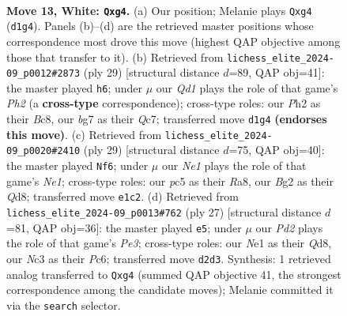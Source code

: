 \documentclass[11pt]{article}
\begin{document}
\clearpage

\begin{figure}[p]\centering
\begin{subfigure}{0.46\textwidth}\centering
\resizebox{\linewidth}{!}{%
\newchessgame
\chessboard[
  setfen={r1bqnr1k/pp1pppbp/8/2p5/2P3p1/2N5/PP1P1PBP/R1BQNRK1 w - - 0 13},
  showmover=false,
  pgfstyle=straightmove, color=movearrow, markmove={d1-g4}
]}
\caption{}
\end{subfigure}\hfill
\begin{subfigure}{0.46\textwidth}\centering
\resizebox{\linewidth}{!}{%
\newchessgame
\chessboard[
  setfen={r1b2rk1/ppq2ppp/3b1n2/8/3p4/3P1B1P/PP3PP1/RNBQR1K1 b - - 0 15},
  showmover=false,
  pgfstyle=straightmove, color=movearrow, markmove={h7-h6}
]}
\caption{}
\end{subfigure}
\\[4pt]
\begin{subfigure}{0.46\textwidth}\centering
\resizebox{\linewidth}{!}{%
\newchessgame
\chessboard[
  setfen={r1bqnrk1/pp2bppp/2p5/8/2NP4/8/PP3PPP/R1BQRBK1 b - - 0 15},
  showmover=false,
  pgfstyle=straightmove, color=movearrow, markmove={e8-f6}
]}
\caption{}
\end{subfigure}\hfill
\begin{subfigure}{0.46\textwidth}\centering
\resizebox{\linewidth}{!}{%
\newchessgame
\chessboard[
  setfen={r1bq1rk1/pp4pp/2p1pb2/3n4/8/1P6/1PPNBPPP/R1BQR1K1 b - - 1 14},
  showmover=false,
  pgfstyle=straightmove, color=movearrow, markmove={e6-e5}
]}
\caption{}
\end{subfigure}
\caption{\textbf{Move 13, White: \texttt{Qxg4}.} (a) Our position; Melanie plays \texttt{Qxg4} (\texttt{d1g4}). Panels (b)--(d) are the retrieved master positions whose correspondence most drove this move (highest QAP objective among those that transfer to it). (b) Retrieved from \texttt{lichess\_elite\_2024-09\_p0012\#2873} (ply 29) [structural distance $d$=89, QAP obj=41]: the master played \texttt{h6}; under $\mu$ our \emph{Qd1} plays the role of that game's \emph{Ph2} (a \textbf{cross-type} correspondence); cross-type roles: our \emph{P}h2 as their \emph{B}c8, our \emph{b}g7 as their \emph{Q}c7; transferred move \texttt{d1g4} \textbf{(endorses this move)}. (c) Retrieved from \texttt{lichess\_elite\_2024-09\_p0020\#2410} (ply 29) [structural distance $d$=75, QAP obj=40]: the master played \texttt{Nf6}; under $\mu$ our \emph{Ne1} plays the role of that game's \emph{Ne1}; cross-type roles: our \emph{p}c5 as their \emph{R}a8, our \emph{B}g2 as their \emph{Q}d8; transferred move \texttt{e1c2}. (d) Retrieved from \texttt{lichess\_elite\_2024-09\_p0013\#762} (ply 27) [structural distance $d$=81, QAP obj=36]: the master played \texttt{e5}; under $\mu$ our \emph{Pd2} plays the role of that game's \emph{Pe3}; cross-type roles: our \emph{N}e1 as their \emph{Q}d8, our \emph{N}c3 as their \emph{P}c6; transferred move \texttt{d2d3}. Synthesis: 1 retrieved analog transferred to \texttt{Qxg4} (summed QAP objective 41, the strongest correspondence among the candidate moves); Melanie committed it via the \texttt{search} selector.}
\label{fig:thought-m24}
\end{figure}
\end{document}

